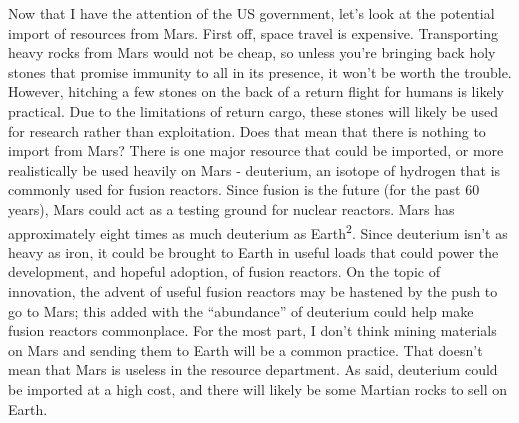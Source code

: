 \documentclass[main.tex]{subfiles}
\begin{document}
Now that I have the attention of the US government, let's look at the potential import of resources from Mars. First off, space travel is expensive. Transporting heavy rocks from Mars would not be cheap, so unless you're bringing back holy stones that promise immunity to all in its presence, it won't be worth the trouble. However, hitching a few stones on the back of a return flight for humans is likely practical. Due to the limitations of return cargo, these stones will likely be used for research rather than exploitation. Does that mean that there is nothing to import from Mars? There is one major resource that could be imported, or more realistically be used heavily on Mars - deuterium, an isotope of hydrogen that is commonly used for fusion reactors. Since fusion is the future (for the past 60 years), Mars could act as a testing ground for nuclear reactors. Mars has approximately eight times as much deuterium as Earth\textsuperscript{2}. Since deuterium isn't as heavy as iron, it could be brought to Earth in useful loads that could power the development, and hopeful adoption, of fusion reactors. On the topic of innovation, the advent of useful fusion reactors may be hastened by the push to go to Mars; this added with the “abundance” of deuterium could help make fusion reactors commonplace. For the most part, I don't think mining materials on Mars and sending them to Earth will be a common practice. That doesn't mean that Mars is useless in the resource department. As said, deuterium could be imported at a high cost, and there will likely be some Martian rocks to sell on Earth.
\end{document}
